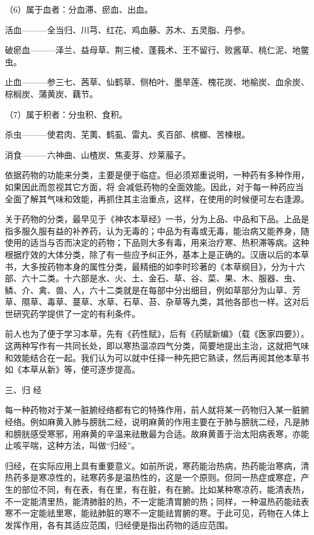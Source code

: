 \documentclass[a4paper,12pt,UTF8,twoside]{ctexbook}
\begin{document}
（6）属于血者：分血滞、瘀血、出血。

活血———全当归、川芎、红花、鸡血藤、苏木、五灵脂、丹参。

破瘀血———泽兰、益母草、荆三棱、蓬莪术、王不留行、败酱草、桃仁泥、地鳖虫。

止血———参三七、茜草、仙鹤草、侧柏叶、墨旱莲、槐花炭、地榆炭、血余炭、棕榈炭、蒲黄炭、藕节。

（7）属于积者：分虫积、食积。

杀虫———使君肉、芜荑、鹤虱、雷丸、炙百部、槟榔、苦楝根。

消食———六神曲、山楂炭、焦麦芽、炒莱菔子。

依据药物的功能来分类，主要是便于临症。但必须郑重说明，一种药有多种作用，如果因此而忽视其它方面，将
会减低药物的全面效能。因此，对于每一种药应当全面了解其气味和效能，再抓住其主治重点，这样，在使用的时候便可左右逢源。

关于药物的分类，最早见于《神农本草经》一书，分为上品、中品和下品。上品是指多服久服有益的补养药，认为无毒的；中品为有毒或无毒，能治病又能养身，随使用的适当与否而决定的药物；下品则大多有毒，用来治疗寒、热积滞等病。这种根据疗效的大体分类，除了有一些应予纠正外，基本上是正确的。汉唐以后的本草书，大多按药物本身的属性分类，最精细的如李时珍著的《本草纲目》，分为十六部、六十二类。十六部是水、火、土、金石、草、谷、菜、果、木、服器、虫、鳞、介、禽、兽、人，六十二类就是在每部中分出细目，例如草部分为山草、芳草、隰草、毒草、蔓草、水草、石草、苔、杂草等九类，其他各部也一样。这对后世研究药学提供了一定的有利条件。

前人也为了便于学习本草，先有《药性赋》，后有《药赋新编》（载《医家四要》）。这两种写作有一共同长处，即以寒热温凉四气分类，简要地提出主治，这就把气味和效能结合在一起。我们认为可以就中任择一种先把它熟读，然后再阅其他本草书如《本草从新》等，便可逐步提高。

三、归 经

每一种药物对于某一脏腑经络都有它的特殊作用，前人就将某一药物归入某一脏腑经络。例如麻黄入肺与膀胱二经，说明麻黄的作用主要在于肺与膀胱二经，凡是肺和膀胱感受寒邪，用麻黄的辛温来祛散最为合适。故麻黄善于治太阳病表寒，亦能止咳平喘，这种方法，叫做“归经”。

归经，在实际应用上具有重要意义。如前所说，寒药能治热病，热药能治寒病，清热药多是寒凉性的，祛寒药多是温热性的，这是一个原则。但同一热症或寒症，产生的部位不同，有在表，有在里，有在脏，有在腑。比如某种寒凉药，能清表热，不一定能清里热，能清肺脏的热，不一定能清胃腑的热；同样，一种温热药能祛表寒不一定能祛里寒，能祛肺脏的寒不一定能祛胃腑的寒。于此可见，药物在人体上发挥作用，各有其适应范围，归经便是指出药物的适应范围。
\end{document}
